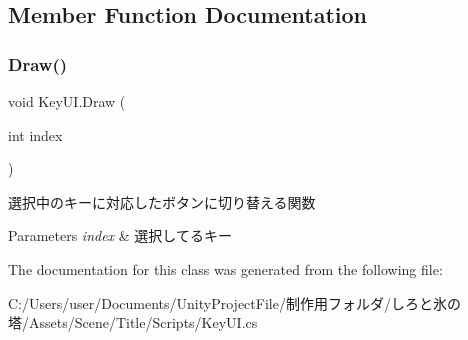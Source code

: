 \subsection{Member Function Documentation}
\mbox{\label{class_key_u_i_ab3b1c1baabb2fd2736359804b00c2db7}} 
\subsubsection{\texorpdfstring{Draw()}{Draw()}}
{\footnotesize\ttfamily void Key\+U\+I.\+Draw (\begin{DoxyParamCaption}\item[{int}]{index }\end{DoxyParamCaption})\hspace{0.3cm}{\ttfamily [inline]}}



選択中のキーに対応したボタンに切り替える関数 


\begin{DoxyParams}{Parameters}
{\em index} & 選択してるキー\\
\hline
\end{DoxyParams}


The documentation for this class was generated from the following file\+:\begin{DoxyCompactItemize}
\item 
C\+:/\+Users/user/\+Documents/\+Unity\+Project\+File/制作用フォルダ/しろと氷の塔/\+Assets/\+Scene/\+Title/\+Scripts/Key\+U\+I.\+cs\end{DoxyCompactItemize}
